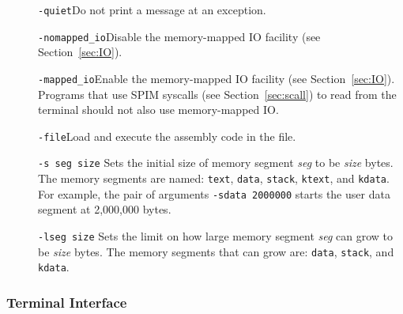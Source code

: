 \begin{description}
  \item [] {\tt -quiet}\newline Do not print a message at an
exception.

  \item [] {\tt -nomapped\_io}\newline Disable the memory-mapped IO
facility (see Section~\ref{sec:IO}).

  \item [] {\tt -mapped\_io}\newline Enable the memory-mapped IO facility
(see Section~\ref{sec:IO}).  Programs that use SPIM syscalls (see
Section~\ref{sec:scall}) to read from the terminal should not also use
memory-mapped IO.

  \item [] {\tt -file}\newline Load and execute the assembly code in
the file.

  \item [] {\tt -s seg size} Sets the initial size of memory segment
{\em seg\/} to be {\em size\/} bytes.  The memory segments are named:
{\tt text}, {\tt data}, {\tt stack}, {\tt ktext}, and {\tt kdata}.
For example, the pair of arguments {\tt -sdata 2000000} starts the
user data segment at 2,000,000 bytes.

  \item [] {\tt -lseg size} Sets the limit on how large memory segment
{\em seg\/} can grow to be {\em size\/} bytes.  The memory segments
that can grow are: {\tt data}, {\tt stack}, and {\tt kdata}.
\end{description}

\subsubsection{Terminal Interface}

